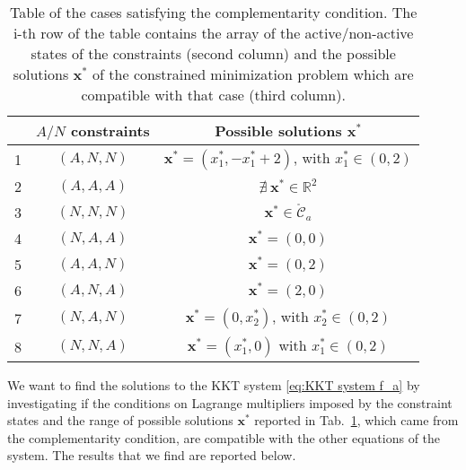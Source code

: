 \documentclass[a4paper,11pt]{article}
\begin{document}
\begin{table}[H]
	\centering
	\begin{tabular}{|c|c|c|}
		\hline
		& $A/N$ constraints & Possible solutions $\textbf{x}^*$ \\
		\hline
		1 & $(A, N, N)$ & $\textbf{x}^* = (x_{1}^*,-x_{1}^*+2)$, with $x_{1}^*\in (0,2)$\\
		2 & $(A, A, A)$ & $\nexists \ \textbf{x}^* \in \mathbb{R}^{2}$\\
		3 & $(N, N, N)$ & $\textbf{x}^* \in \mathring{\mathcal{C}}_{a}$\\
		4 & $(N, A, A)$ & $\textbf{x}^* = (0,0)$\\
		5 & $(A, A, N)$ & $\textbf{x}^* = (0,2)$\\
		6 & $(A, N, A)$ & $\textbf{x}^* = (2,0)$\\
		7 & $(N, A, N)$ & $\textbf{x}^* = (0,x_{2}^*)$, with $x_{2}^* \in (0,2)$\\
		8 & $(N, N, A)$ & $\textbf{x}^* = (x_{1}^*,0)$ with $x_{1}^* \in (0,2)$\\
		\hline
	\end{tabular}
	\caption{Table of the cases satisfying the complementarity condition. The i-th row of the table contains the array of the active/non-active states of the constraints (second column) and the possible solutions $\textbf{x}^*$ of the constrained minimization problem which are compatible with that case (third column).}
	\label{tab:complementarity conditions f_a}
\end{table}
\noindent We want to find the solutions to the KKT system \eqref{eq:KKT system f_a} by investigating if the conditions on Lagrange multipliers imposed by the constraint states and the range of possible solutions $\textbf{x}^*$ reported in Tab.~\ref*{tab:complementarity conditions f_a}, which came from the complementarity condition, are compatible with the other equations of the system.
The results that we find are reported below.
\end{document}

